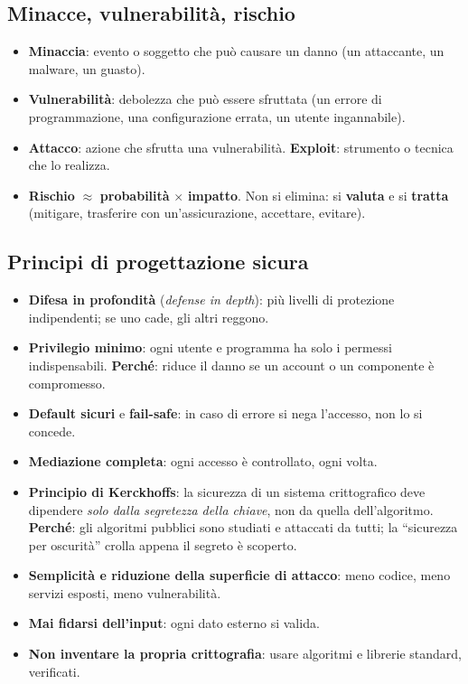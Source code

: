 \subsection{Minacce, vulnerabilità, rischio}
\begin{itemize}
    \item \textbf{Minaccia}: evento o soggetto che può causare un danno (un attaccante, un malware, un guasto).
    \item \textbf{Vulnerabilità}: debolezza che può essere sfruttata (un errore di programmazione, una configurazione errata, un utente ingannabile).
    \item \textbf{Attacco}: azione che sfrutta una vulnerabilità. \textbf{Exploit}: strumento o tecnica che lo realizza.
    \item \textbf{Rischio} $\approx$ \textbf{probabilità} $\times$ \textbf{impatto}. Non si elimina: si \textbf{valuta} e si \textbf{tratta} (mitigare, trasferire con un'assicurazione, accettare, evitare).
\end{itemize}

\subsection{Principi di progettazione sicura}
\begin{itemize}
    \item \textbf{Difesa in profondità} (\emph{defense in depth}): più livelli di protezione indipendenti; se uno cade, gli altri reggono.
    \item \textbf{Privilegio minimo}: ogni utente e programma ha solo i permessi indispensabili. \textbf{Perché}: riduce il danno se un account o un componente è compromesso.
    \item \textbf{Default sicuri} e \textbf{fail-safe}: in caso di errore si nega l'accesso, non lo si concede.
    \item \textbf{Mediazione completa}: ogni accesso è controllato, ogni volta.
    \item \textbf{Principio di Kerckhoffs}: la sicurezza di un sistema crittografico deve dipendere \emph{solo dalla segretezza della chiave}, non da quella dell'algoritmo. \textbf{Perché}: gli algoritmi pubblici sono studiati e attaccati da tutti; la ``sicurezza per oscurità'' crolla appena il segreto è scoperto.
    \item \textbf{Semplicità e riduzione della superficie di attacco}: meno codice, meno servizi esposti, meno vulnerabilità.
    \item \textbf{Mai fidarsi dell'input}: ogni dato esterno si valida.
    \item \textbf{Non inventare la propria crittografia}: usare algoritmi e librerie standard, verificati.
\end{itemize}

